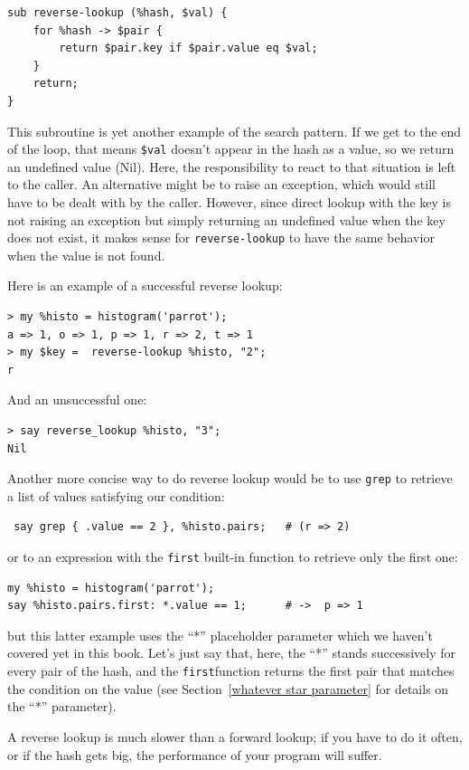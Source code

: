 \begin{verbatim}
sub reverse-lookup (%hash, $val) { 
    for %hash -> $pair { 
        return $pair.key if $pair.value eq $val;
    }
    return;
}
\end{verbatim}
%
This subroutine is yet another example of the search pattern.
If we get to the end of the loop, that means \verb'$val'
doesn't appear in the hash as a value, so we return an 
undefined value (Nil). Here, the responsibility to react 
to that situation is left to the caller. An alternative 
might be to raise an exception, which would still have 
to be dealt with by the caller. However, since direct 
lookup with the key is not raising an exception but simply 
returning an undefined value when the key does not exist, 
it makes sense for {\tt reverse-lookup} to have the same 
behavior when the value is not found.

Here is an example of a successful reverse lookup:

\begin{verbatim}
> my %histo = histogram('parrot');
a => 1, o => 1, p => 1, r => 2, t => 1
> my $key =  reverse-lookup %histo, "2";
r
\end{verbatim}
%
And an unsuccessful one:

\begin{verbatim}
> say reverse_lookup %histo, "3";
Nil
\end{verbatim}
%

Another more concise way to do reverse lookup would be to 
use {\tt grep} to retrieve a list of values satisfying our 
condition:
\begin{verbatim}
 say grep { .value == 2 }, %histo.pairs;   # (r => 2)
\end{verbatim}

or to an expression with the {\tt first} built-in function 
to retrieve only the first one:
\begin{verbatim}
my %histo = histogram('parrot');
say %histo.pairs.first: *.value == 1;      # ->  p => 1
\end{verbatim}

but this latter example uses the ``*'' placeholder parameter 
which we haven't covered yet in this book. Let's just say that, 
here, the ``*'' stands successively for every pair of the hash, 
and the {\tt first}function returns the first pair that matches 
the condition on the value (see 
Section~\ref{whatever star parameter} for details on the 
``*'' parameter).

A reverse lookup is much slower than a forward lookup; if you
have to do it often, or if the hash gets big, the performance
of your program will suffer.

